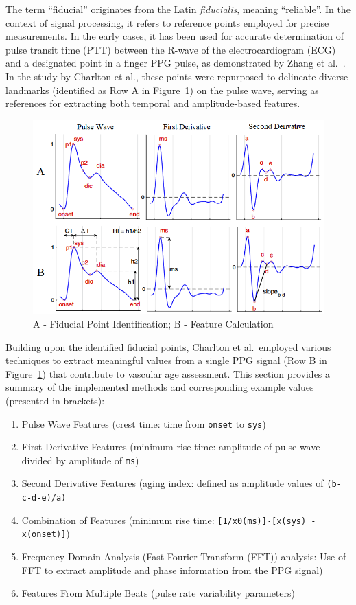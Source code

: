 The term \enquote{fiducial} originates from the Latin \textit{fiducialis}, meaning \enquote{reliable}.
In the context of signal processing, it refers to reference points employed for precise measurements.
In the early cases, it has been used for accurate determination of pulse transit time (PTT) between the R-wave of the electrocardiogram (ECG) and a designated point in a finger PPG pulse, as demonstrated by Zhang et al.~\cite{zhangEffectLocalCold2005}.
In the study by Charlton et al., these points were repurposed to delineate diverse landmarks (identified as Row A in Figure~\ref{fig:fiducials}) on the pulse wave, serving as references for extracting both temporal and amplitude-based features.

\begin{figure}[h]
    \centering
    \includegraphics[scale=0.8]{images/sp/fiducials}
    \caption{A - Fiducial Point Identification; B - Feature Calculation~\cite{charltonAssessingHemodynamicsPhotoplethysmogram2022}}
    \label{fig:fiducials}
\end{figure}

Building upon the identified fiducial points, Charlton et al.\ employed various techniques to extract meaningful values from a single PPG signal (Row B in Figure~\ref{fig:fiducials}) that contribute to vascular age assessment.
This section provides a summary of the implemented methods and corresponding example values (presented in brackets):
\begin{enumerate}
    \item Pulse Wave Features (crest time: time from \texttt{onset} to \texttt{sys})
    \item First Derivative Features (minimum rise time: amplitude of pulse wave divided by amplitude of \texttt{ms})
    \item Second Derivative Features (aging index: defined as amplitude values of \mbox{\texttt{(b-c-d-e)/a)}}
    \item Combination of Features (minimum rise time: \texttt{[1/x0(ms)]·[x(sys) - x(onset)]})
    \item Frequency Domain Analysis (Fast Fourier Transform (FFT)) analysis: Use of FFT to extract amplitude and phase information from the PPG signal)
    \item Features From Multiple Beats (pulse rate variability parameters)
\end{enumerate}

